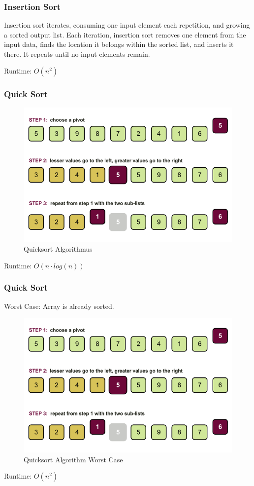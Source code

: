\begin{frame}[fragile]
\frametitle{Insertion Sort}
{\tiny
Insertion sort iterates, consuming one input element each repetition, and growing a sorted output list.
Each iteration, insertion sort removes one element from the input data, finds the location it belongs within
the sorted list, and inserts it there. It repeats until no input elements remain.

Runtime: $O(n^2)$
}
\end{frame}

\begin{frame}[fragile]
\frametitle{Quick Sort}
\begin{figure}[h]
\centering\includegraphics[scale=0.3]{img/quicksort_new.png}
\caption{Quicksort Algorithmus}
\end{figure}
Runtime: $O(n \cdot log(n))$
\end{frame}

\begin{frame}[fragile]
\frametitle{Quick Sort}
Worst Case: Array is already sorted.
\begin{figure}[h]
\centering\includegraphics[scale=0.3]{img/quicksort_new.png}
\caption{Quicksort Algorithm Worst Case}
\end{figure}
Runtime: $O(n^2)$
\end{frame}

